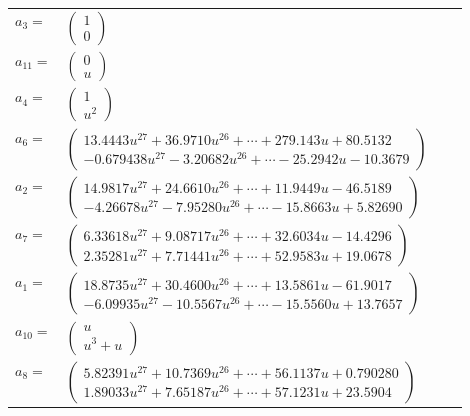 \documentclass[1p]{elsarticle_modified}
\theoremstyle{definition}
\begin{document}
\begin{tabular}{m{7pt} m{180pt} m{7pt} m{180pt} }
\flushright $a_{3}=$&$\begin{pmatrix}1\\0\end{pmatrix}$ \\
\flushright $a_{11}=$&$\begin{pmatrix}0\\u\end{pmatrix}$ \\
\flushright $a_{4}=$&$\begin{pmatrix}1\\u^2\end{pmatrix}$ \\
\flushright $a_{6}=$&$\begin{pmatrix}13.4443 u^{27}+36.9710 u^{26}+\cdots+279.143 u+80.5132\\-0.679438 u^{27}-3.20682 u^{26}+\cdots-25.2942 u-10.3679\end{pmatrix}$ \\
\flushright $a_{2}=$&$\begin{pmatrix}14.9817 u^{27}+24.6610 u^{26}+\cdots+11.9449 u-46.5189\\-4.26678 u^{27}-7.95280 u^{26}+\cdots-15.8663 u+5.82690\end{pmatrix}$ \\
\flushright $a_{7}=$&$\begin{pmatrix}6.33618 u^{27}+9.08717 u^{26}+\cdots+32.6034 u-14.4296\\2.35281 u^{27}+7.71441 u^{26}+\cdots+52.9583 u+19.0678\end{pmatrix}$ \\
\flushright $a_{1}=$&$\begin{pmatrix}18.8735 u^{27}+30.4600 u^{26}+\cdots+13.5861 u-61.9017\\-6.09935 u^{27}-10.5567 u^{26}+\cdots-15.5560 u+13.7657\end{pmatrix}$ \\
\flushright $a_{10}=$&$\begin{pmatrix}u\\u^3+u\end{pmatrix}$ \\
\flushright $a_{8}=$&$\begin{pmatrix}5.82391 u^{27}+10.7369 u^{26}+\cdots+56.1137 u+0.790280\\1.89033 u^{27}+7.65187 u^{26}+\cdots+57.1231 u+23.5904\end{pmatrix}$ \\

\end{tabular}
\end{document}
